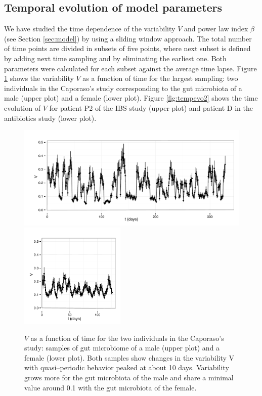 \subsection*{Temporal evolution of model parameters}

We have studied the time dependence of the variability $V$ and power law index $\beta$ (see Section \ref{sec:model}) by using a sliding window approach. The total number of time points are divided in subsets of five points, where next subset is defined by adding next time sampling and by eliminating the earliest one. Both parameters were calculated for each subset against the average time lapse. Figure \ref{fig:tempevo1} shows the variability  $V$ as a function of time for the largest sampling: two individuals in the Caporaso's study\cite{moving} corresponding to the gut microbiota of a male (upper plot) and a female (lower plot). Figure \ref{fig:tempevo2} shows the time evolution of $V$ for patient P2 of the IBS study\cite{IBS} (upper plot) and patient D in the antibiotics study\cite{antibiotic} (lower plot). 

\begin{figure}
	\includegraphics[width=1.0\textwidth]{results/sliwin/male_mov.pdf}
	\hspace*{3mm}\includegraphics[width=0.448\textwidth]{results/sliwin/female_mov.pdf}
\caption{$V$ as a function of time for the two individuals in the Caporaso's study\cite{moving}: samples of gut microbiome of a male (upper plot) and a female (lower plot). Both samples show changes in the variability V with quasi--periodic behavior peaked at about 10 days. Variability grows more for the gut microbiota of the male and share a minimal value around 0.1 with the gut microbiota of the female.}
\label{fig:tempevo1}
\end{figure}

